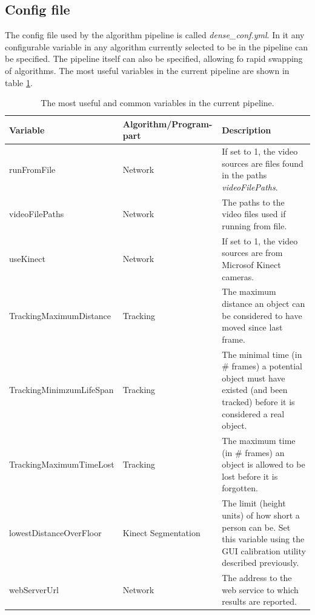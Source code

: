 \newpage
\subsection{Config file}
The config file used by the algorithm pipeline is called \textit{dense\_conf.yml}. In it any configurable variable in any algorithm currently selected to be in the pipeline can be specified. The pipeline itself can also be specified, allowing fo rapid swapping of algorithms. The most useful variables in the current pipeline are shown in table \ref{table:commonVariables}.\\

\begin{table}[hbt]
	\begin{tabular}{ | l | l | p{7.5cm} | }
	    \hline
	    \textbf{Variable} & \textbf{Algorithm/Program-part} & \textbf{Description} \\ \hline
	    runFromFile & Network & If set to 1, the video sources are files found in the paths \textit{videoFilePaths}.  \\ \hline
	    videoFilePaths & Network & The paths to the video files used if running from file.  \\ \hline
	    useKinect & Network & If set to 1, the video sources are from Microsof Kinect cameras. \\ \hline
	    TrackingMaximumDistance & Tracking & The maximum distance an object can be considered to have moved since last frame. \\ \hline
	    TrackingMinimzumLifeSpan & Tracking & The minimal time (in \# frames) a potential object must have existed (and been tracked) before it is considered a real object. \\ \hline
	    TrackingMaximumTimeLost & Tracking & The maximum time (in \# frames) an object is allowed to be lost before it is forgotten. \\ \hline
	    lowestDistanceOverFloor & Kinect Segmentation & The limit (height units) of how short a person can be. Set this variable using the GUI calibration utility described previously. \\ \hline
	    webServerUrl & Network & The address to the web service to which results are reported. \\ \hline
	\end{tabular}
	\label{table:commonVariables}
	\caption{The most useful and common variables in the current pipeline.}
\end{table}

